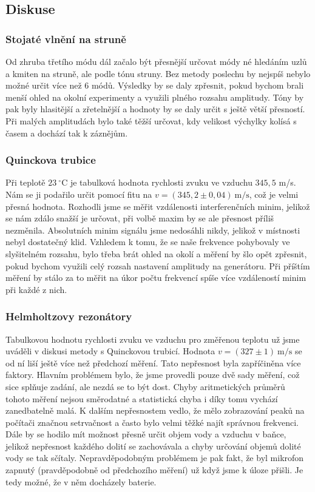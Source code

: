 \documentclass[english]{article}
\newcommand{\unit}[1]{\mathrm{#1}}
\begin{document}
\subsection{Diskuse}	
	\subsubsection{Stojaté vlnění na struně}
		Od zhruba třetího módu dál začalo být přesnější určovat módy né hledáním uzlů a kmiten na struně, ale podle tónu struny. Bez metody poslechu by nejspíš nebylo možné určit více než 6 módů. Výsledky by se daly zpřesnit, pokud bychom brali menší ohled na okolní experimenty a využili plného rozsahu amplitudy. Tóny by pak byly hlasitější a zřetelnější a hodnoty by se daly určit s ještě větší přesností. Při malých amplitudách bylo také těžší určovat, kdy velikost výchylky kolísá s časem a dochází tak k záznějům. 
		
	\subsubsection{Quinckova trubice}
		Při teplotě $23\ \unit{^\circ C}$ je tabulková hodnota \cite{bib:tabulky} rychlosti zvuku ve vzduchu $345,5$ m/s. Nám se ji podařilo určit pomocí fitu na $v = (345,2 \pm 0,04)\ \unit{m/s}$, což je velmi přesná hodnota. Rozhodli jsme se měřit vzdálenosti interferenčních minim, jelikož se nám zdálo snažší je určovat, při volbě maxim by se ale přesnost příliš nezměnila. Absolutních minim signálu jsme nedosáhli nikdy, jelikož v místnosti nebyl dostatečný klid. Vzhledem k tomu, že se naše frekvence pohybovaly ve slyšitelném rozsahu, bylo třeba brát ohled na okolí a měření by šlo opět zpřesnit, pokud bychom využili celý rozsah nastavení amplitudy na generátoru. Při příštím měření by stálo za to měřit na úkor počtu frekvencí spíše více vzdáleností minim při každé z nich. 
		
	\subsubsection{Helmholtzovy rezonátory}
    	Tabulkovou hodnotu rychlosti zvuku ve vzduchu pro změřenou teplotu už jsme uváděli v diskusi metody s Quinckovou trubicí. Hodnota $v = (327 \pm 1)\ \unit{m/s}$ se od ní liší ještě více než předchozí měření. Tato nepřesnost byla zapříčiněna více faktory. Hlavním problémem bylo, že jsme provedli pouze dvě sady měření, což sice splňuje zadání, ale nezdá se to být dost. Chyby aritmetických průměrů tohoto měření nejsou směrodatné a statistická chyba i díky tomu vychází zanedbatelně malá. K dalším nepřesnostem vedlo, že mělo zobrazování peaků na počítači značnou setrvačnost a často bylo velmi těžké najít správnou frekvenci. Dále by se hodilo mít možnost přesně určit objem vody a vzduchu v baňce, jelikož nepřesnost každého dolití se zachovávala a chyby určování objemů dolité vody se tak sčítaly. Nepravděpodobným problémem je pak fakt, že byl mikrofon zapnutý (pravděpodobně od předchozího měření) už když jsme k úloze přišli. Je tedy možné, že v něm docházely baterie.
    	
\end{document}

